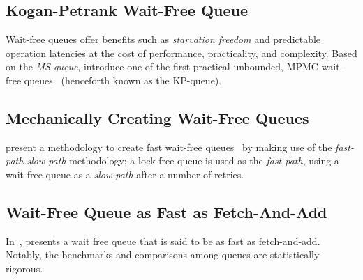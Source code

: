 


\subsection{Kogan-Petrank Wait-Free Queue}
Wait-free queues offer benefits such as \emph{starvation freedom} and predictable
operation latencies at the cost of performance, practicality, and complexity.
Based on the \emph{MS-queue}, \citeauthor{kogan2011wait} introduce one of the first practical unbounded, MPMC
wait-free queues~\citep{kogan2011wait} (henceforth known as the KP-queue).

\subsection{Mechanically Creating Wait-Free Queues}
\citeauthor{kogan2012methodology} present a methodology to create fast wait-free
queues~\citep{kogan2012methodology} by making use of the
\emph{fast-path-slow-path} methodology; a lock-free queue is used as the
\emph{fast-path}, using a wait-free queue as a \emph{slow-path} after a number
of retries.

\subsection{Wait-Free Queue as Fast as Fetch-And-Add}
In~\citep{yang2016wait}, \citeauthor{yang2016wait} presents a wait free queue
that is said to be as fast as fetch-and-add. Notably, the benchmarks and
comparisons among queues are statistically rigorous.